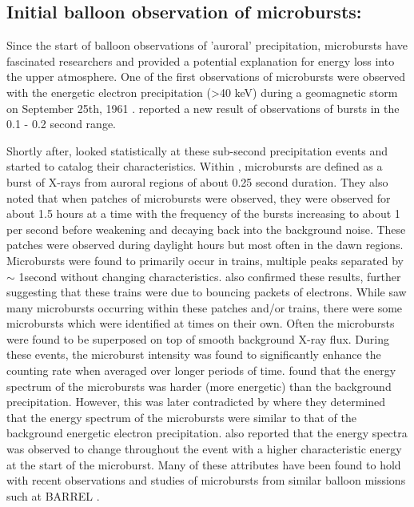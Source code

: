 \documentclass[referee,a4paper,12pt,traditabstract]{swsc}
\begin{document}
\begin{linenumbers}
\subsection{Initial balloon observation of microbursts:}

Since the start of balloon observations of 'auroral' precipitation, microbursts have fascinated researchers and provided a potential explanation for energy loss into the upper atmosphere. One of the first observations of microbursts were observed with the energetic electron precipitation (>40 keV) during a geomagnetic storm on September 25th, 1961 \citep{Winckler1962}. \citet{Winckler1962} reported a new result of observations of bursts in the 0.1 - 0.2 second range. 

Shortly after, \citet{Anderson1964} looked statistically at these sub-second precipitation events and started to catalog their characteristics. Within \citet{Anderson1964}, microbursts are defined as a burst of X-rays from auroral regions of about 0.25 second duration. They also noted that when patches of microbursts were observed, they were observed for about 1.5 hours at a time with the frequency of the bursts increasing to about 1 per second before weakening and decaying back into the background noise. These patches were observed during daylight hours but most often in the dawn regions. Microbursts were found to primarily occur in trains, multiple peaks separated by $\sim$ 1second without changing characteristics. \citet{Parks1965} also confirmed these results, further suggesting that these trains were due to bouncing packets of electrons. While \citet{Anderson1964} saw many microbursts occurring within these patches and/or trains, there were some microbursts which were identified at times on their own. Often the microbursts were found to be superposed on top of smooth background X-ray flux. During these events, the microburst intensity was found to significantly enhance the counting rate when averaged over longer periods of time. \citet{Anderson1964} found that the energy spectrum of the microbursts was harder (more energetic) than the background precipitation. However, this was later contradicted by \citet{Hudson1965} where they determined that the energy spectrum of the microbursts were similar to that of the background energetic electron precipitation. \citet{Anderson1964} also reported that the energy spectra was observed to change throughout the event with a higher characteristic energy at the start of the microburst.  Many of these attributes have been found to hold with recent observations and studies of microbursts from similar balloon missions such at BARREL \citep[e.g.][]{Woodger2015, Anderson2017}. 


\end{linenumbers}
\end{document}
